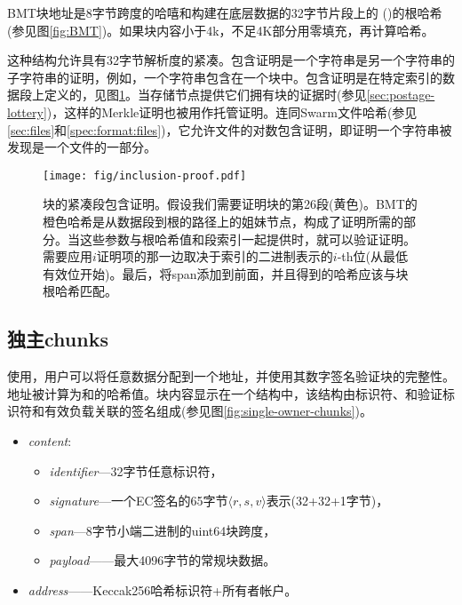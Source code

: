 BMT块地址是8字节跨度的哈嘻和构建在底层数据的32字节片段上的 ()的根哈希(参见图\ref{fig:BMT})。如果块内容小于4k，不足4K部分用零填充，再计算哈希。

这种结构允许具有32字节解析度的紧凑。包含证明是一个字符串是另一个字符串的子字符串的证明，例如，一个字符串包含在一个块中。包含证明是在特定索引的数据段上定义的，见图\ref{fig:chunk-inclusion}。当存储节点提供它们拥有块的证据时(参见\ref{sec:postage-lottery})，这样的Merkle证明也被用作托管证明。连同Swarm文件哈希(参见\ref{sec:files}和\ref{spec:format:files})，它允许文件的对数包含证明，即证明一个字符串被发现是一个文件的一部分。
\begin{figure}[htbp]
\centering
\texttt{[image: fig/inclusion-proof.pdf]}
\caption[块的紧凑段包含证明\statusgreen]{块的紧凑段包含证明。假设我们需要证明块的第26段(黄色)。BMT的橙色哈希是从数据段到根的路径上的姐妹节点，构成了证明所需的部分。当这些参数与根哈希值和段索引一起提供时，就可以验证证明。需要应用$i$证明项的那一边取决于索引的二进制表示的$i$-th位(从最低有效位开始)。最后，将span添加到前面，并且得到的哈希应该与块根哈希匹配。}
\label{fig:chunk-inclusion}
\end{figure}


\subsection{独主chunks\statusgreen}\label{sec:single-owner-chunks}

使用，用户可以将任意数据分配到一个地址，并使用其数字签名验证块的完整性。地址被计算为和的哈希值。块内容显示在一个结构中，该结构由标识符、和验证标识符和有效负载关联的签名组成(参见图\ref{fig:single-owner-chunks})。

\begin{itemize}
    \item \emph{content}: 
\begin{itemize}
    \item \emph{identifier}—32字节任意标识符， 
    \item \emph{signature}—一个EC签名的65字节$\langle r,s,v \rangle$表示(32+32+1字节)，
    \item \emph{span}—8字节小端二进制的uint64块跨度，
    \item \emph{payload}——最大4096字节的常规块数据。
\end{itemize}
    \item \emph{address}——Keccak256哈希标识符+所有者帐户。
\end{itemize}

